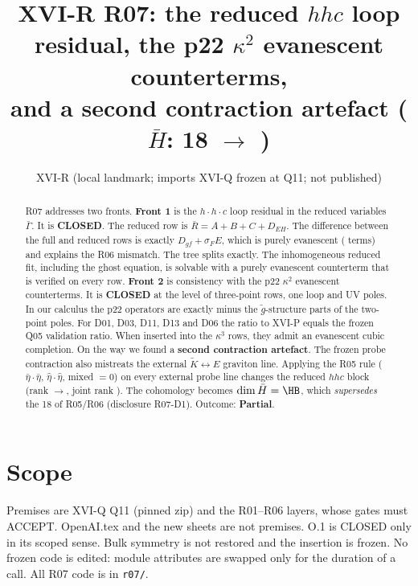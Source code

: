 \documentclass[11pt]{article}
\title{XVI-R R07: the reduced $hhc$ loop residual, the p22 $\kappa^2$ evanescent counterterms,\\
and a second contraction artefact ($\bar H$: 18 $\to$ \HB)}
\author{XVI-R (local landmark; imports XVI-Q frozen at Q11; not published)}
\date{}
\begin{document}
\maketitle
\begin{abstract}
R07 addresses two fronts. \textbf{Front 1} is the $h\!\cdot\!h\!\cdot\!c$ loop residual in the reduced variables $\bar\Gamma$.
It is \textbf{CLOSED}. The reduced row is $\bar R=A+B+C+D_{EH}$. The difference between the full and reduced rows is
exactly $D_{gf}+\sigma_F E$, which is purely evanescent (\GFE{} terms) and explains the R06 mismatch. The tree splits
exactly. The inhomogeneous reduced fit, including the ghost equation, is solvable with a purely evanescent counterterm
that is verified on every row.
\textbf{Front 2} is consistency with the p22 $\kappa^2$ evanescent counterterms. It is \textbf{CLOSED} at the level of
three-point rows, one loop and UV poles. In our calculus the p22 operators are exactly minus the $\tilde g$-structure
parts of the two-point poles. For D01, D03, D11, D13 and D06 the ratio to XVI-P equals the frozen Q05 validation ratio.
When inserted into the $\kappa^3$ rows, they admit an evanescent cubic completion.
On the way we found a \textbf{second contraction artefact}. The frozen probe contraction also mistreats the external
$\tilde K\leftrightarrow E$ graviton line. Applying the R05 rule ($\bar\eta\cdot\bar\eta$, $\hat\eta\cdot\hat\eta$,
mixed $=0$) on every external probe line changes the reduced $hhc$ block (rank \BRo$\to$\BRn, joint rank \BRj). The
cohomology becomes $\dim\bar H=\HB$, which \emph{supersedes} the 18 of R05/R06 (disclosure R07-D1). Outcome:
\textbf{Partial}.
\end{abstract}

\section{Scope}
Premises are XVI-Q Q11 (pinned zip) and the R01--R06 layers, whose gates must ACCEPT. OpenAI.tex and the new sheets are
not premises. O.1 is CLOSED only in its scoped sense. Bulk symmetry is not restored and the insertion is frozen. No frozen
code is edited: module attributes are swapped only for the duration of a call. All R07 code is in \texttt{r07/}.
\end{document}
